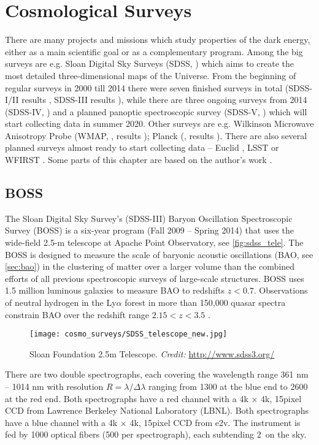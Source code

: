 \chapter{Cosmological Surveys}
\label{chpt:cosmo_surveys}
There are many projects and missions which study properties of the dark energy, either as a main scientific goal or as a complementary program. Among the big surveys are e.g. Sloan Digital Sky Surveys (SDSS, \cite{SDSS}) which aims to create the most detailed three-dimensional maps of the Universe. From the beginning of regular surveys in 2000 till 2014 there were seven finished surveys in total (SDSS-I/II results \cite{SDSS_I_II}, SDSS-III results \cite{BOSS_results}), while there are three ongoing surveys from 2014 (SDSS-IV, \cite{2017AJ....154...28B}) and a planned panoptic spectroscopic survey (SDSS-V, \cite{2017arXiv171103234K}) which will start collecting data in summer 2020. Other surveys are e.g. Wilkinson Microwave Anisotropy Probe (WMAP, \cite{WMAP}, results \cite{WMAP_results}); Planck (\cite{planck}, results \cite{planck_cosm}). There are also several planned surveys almost ready to start collecting data -- Euclid \parencite{euclid}, LSST \parencite{lsst} or WFIRST \parencite{WFIRST_report}. Some parts of this chapter are based on the author's work \textcite{mastersthesis_vrastil}.
\section{BOSS}
The Sloan Digital Sky Survey's (SDSS-III) Baryon Oscillation Spectroscopic Survey (BOSS) is a six-year program (Fall 2009 -- Spring 2014)  that uses the wide-field 2.5-m telescope at Apache Point Observatory, see \autoref{fig:sdss_tele}. The BOSS is designed to measure the scale of baryonic acoustic oscillations (BAO, see \autoref{sec:bao}) in the clustering of matter over a larger volume than the combined efforts of all previous spectroscopic surveys of large-scale structures. BOSS uses 1.5 million luminous galaxies to measure BAO to redshifts $z<0.7$. Observations of neutral hydrogen in the Ly$\alpha$ forest in more than 150,000 quasar spectra constrain BAO over the redshift range $2.15 < z < 3.5$ \cite{BOSS}.
\begin{figure}[tb]
    \centering
    \texttt{[image: cosmo\_surveys/SDSS\_telescope\_new.jpg]}
    \caption{Sloan Foundation 2.5m Telescope. \textit{Credit:} \url{http://www.sdss3.org/}}
    \label{fig:sdss_tele}
\end{figure}

There are two double spectrographs, each covering the wavelength range 361 nm -- 1014 nm with resolution $R=\lambda/\Delta\lambda$ ranging from 1300 at the blue end to 2600 at the red end.  Both spectrographs have a red channel with a 4k $\times$ 4k, 15\um  pixel CCD from Lawrence Berkeley National Laboratory (LBNL). Both spectrographs have a blue channel with a 4k $\times$ 4k, 15\um  pixel CCD from  e2v. The instrument is fed by 1000 optical fibers (500 per spectrograph), each subtending 2\arcsec\ on the sky.

